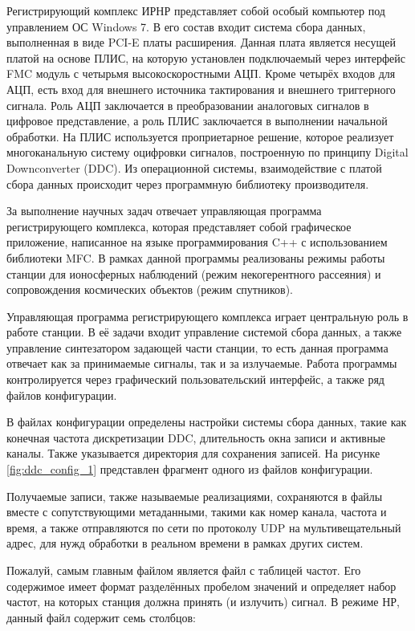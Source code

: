 \documentclass{report}
\begin{document}
Регистрирующий комплекс ИРНР представляет собой особый компьютер под управлением ОС Windows 7. В его состав входит система сбора данных, выполненная в виде PCI-E платы расширения. Данная плата является несущей платой на основе ПЛИС, на которую установлен подключаемый через интерфейс FMC модуль с четырьмя высокоскоростными АЦП. Кроме четырёх входов для АЦП, есть вход для внешнего источника тактирования и внешнего триггерного сигнала. Роль АЦП заключается в преобразовании аналоговых сигналов в цифровое представление, а роль ПЛИС заключается в выполнении начальной обработки. На ПЛИС используется проприетарное решение, которое реализует многоканальную систему оцифровки сигналов, построенную по принципу Digital Downconverter (DDC). Из операционной системы, взаимодействие с платой сбора данных происходит через программную библиотеку производителя.

За выполнение научных задач отвечает управляющая программа регистрирующего комплекса, которая представляет собой графическое приложение, написанное на языке программирования C++ с использованием библиотеки MFC. В рамках данной программы реализованы режимы работы станции для ионосферных наблюдений (режим некогерентного рассеяния) и сопровождения космических объектов (режим спутников).

Управляющая программа регистрирующего комплекса играет центральную роль в работе станции. В её задачи входит управление системой сбора данных, а также управление синтезатором задающей части станции, то есть данная программа отвечает как за принимаемые сигналы, так и за излучаемые. Работа программы контролируется через графический пользовательский интерфейс, а также ряд файлов конфигурации.

В файлах конфигурации определены настройки системы сбора данных, такие как конечная частота дискретизации DDC, длительность окна записи и активные каналы. Также указывается директория для сохранения записей. На рисунке \ref{fig:ddc_config_1} представлен фрагмент одного из файлов конфигурации.


Получаемые записи, также называемые реализациями, сохраняются в файлы вместе с сопутствующими метаданными, такими как номер канала, частота и время, а также отправляются по сети по протоколу UDP на мультивещательный адрес, для нужд обработки в реальном времени в рамках других систем.

Пожалуй, самым главным файлом является файл с таблицей частот. Его содержимое имеет формат разделённых пробелом значений и определяет набор частот, на которых станция должна принять (и излучить) сигнал. В режиме НР, данный файл содержит семь столбцов:
\end{document}
